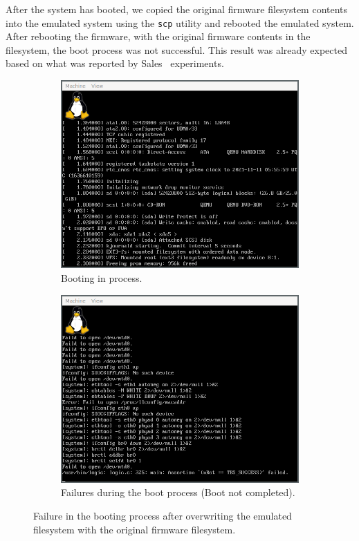 After the system has booted, we copied the original firmware filesystem contents into the emulated system using the {\tt scp} utility and rebooted the emulated system. After rebooting the firmware, with the original firmware contents in the filesystem, the boot process was not successful. This result was already expected based on what was reported by Sales~\cite{victor-sales} experiments.

\begin{figure}[H]
     \centering
     \begin{subfigure}[b]{0.45\textwidth}
         \centering
         \includegraphics[width=\textwidth]{figs/qemu3.png}
         \caption{Booting in process.}
         \label{fig:qemu-loading}
     \end{subfigure}
     \hfill
     \begin{subfigure}[b]{0.45\textwidth}
         \centering
         \includegraphics[width=\textwidth]{figs/qemu4.png}
         \caption{Failures during the boot process (Boot not completed).}
         \label{fig:qemu-booted}
     \end{subfigure}
        \caption{Failure in the booting process after overwriting the emulated filesystem with the original firmware filesystem.}
        \label{fig:qemu-manual-error}
\end{figure}

